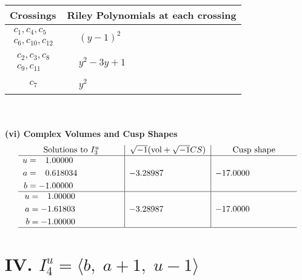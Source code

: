 \documentclass[1p]{elsarticle_modified}
\theoremstyle{definition}
\newcommand{\I}{\sqrt{-1}}
\begin{document}
\begin{tabular}{m{50pt}|m{274pt}}
Crossings & \hspace{64pt}Riley Polynomials at each crossing \\
\hline $$\begin{aligned}c_{1},c_{4},c_{5}\\c_{6},c_{10},c_{12}\end{aligned}$$&$\begin{aligned}
&(y-1)^2
\end{aligned}$\\
\hline $$\begin{aligned}c_{2},c_{3},c_{8}\\c_{9},c_{11}\end{aligned}$$&$\begin{aligned}
&y^2-3 y+1
\end{aligned}$\\
\hline $$\begin{aligned}c_{7}\end{aligned}$$&$\begin{aligned}
&y^2
\end{aligned}$\\
\hline
\end{tabular}\\~\\
\newpage\flushleft \textbf{(vi) Complex Volumes and Cusp Shapes}
$$\begin{array}{c|c|c}  
\text{Solutions to }I^u_{3}& \I (\text{vol} + \sqrt{-1}CS) & \text{Cusp shape}\\
 \hline 
\begin{aligned}
u &= \phantom{-}1.00000\phantom{ +0.000000I} \\
a &= \phantom{-}0.618034\phantom{ +0.000000I} \\
b &= -1.00000\phantom{ +0.000000I}\end{aligned}
 & -3.28987\phantom{ +0.000000I} & -17.0000\phantom{ +0.000000I} \\ \hline\begin{aligned}
u &= \phantom{-}1.00000\phantom{ +0.000000I} \\
a &= -1.61803\phantom{ +0.000000I} \\
b &= -1.00000\phantom{ +0.000000I}\end{aligned}
 & -3.28987\phantom{ +0.000000I} & -17.0000\phantom{ +0.000000I}\\
 \hline 
 \end{array}$$\newpage\newpage\renewcommand{\arraystretch}{1}
\centering \section*{IV. $I^u_{4}= \langle b,\;a+1,\;u-1 \rangle$}
\end{document}
